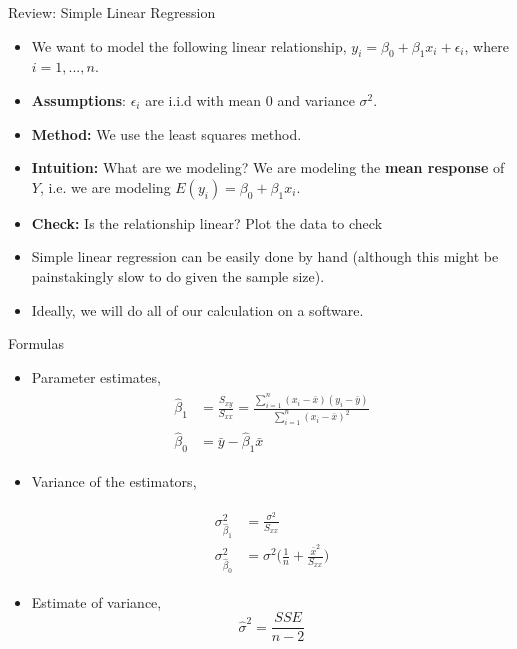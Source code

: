 \documentclass{beamer}
\begin{document}
	
	
	
	
	\begin{frame}{Review: Simple Linear Regression}
		\begin{itemize}
			\item We want to model the following linear relationship, $y_i=\beta_0+\beta_1x_i+\epsilon_i$, where $i=1,...,n$.
			\item \textbf{Assumptions}: $\epsilon_i$ are i.i.d with mean $0$ and variance $\sigma^2$.
			\item \textbf{Method:} We use the least squares method.
			\item \textbf{Intuition:} What are we modeling? We are modeling the \textbf{mean response} of $Y$, i.e. we are modeling $E(y_i)=\beta_0+\beta_1x_i$.
			\item \textbf{Check:} Is the relationship linear? Plot the data to check
			\item Simple linear regression can be easily done by hand (although this might be painstakingly slow to do given the sample size).
			\item Ideally, we will do all of our calculation on a software.
		\end{itemize}
	\end{frame}
	
	
	\begin{frame}{Formulas}
		\begin{itemize}
			\item Parameter estimates,
			\begin{align*}
				\begin{split}
					\hat{\beta}_1 &= \frac{S_{xy}}{S_{xx}}=\frac{\sum^n_{i=1} (x_i-\bar{x})(y_i-\bar{y})}{ \sum^n_{i=1}  (x_i-\bar{x})^2}\\
					\hat{\beta}_0 &= \bar{y}-\hat{\beta}_1\bar{x} 
				\end{split}
			\end{align*}
			
			\item Variance of the estimators,
			
			\begin{align*}
				\begin{split}
					\sigma^2_{\hat{\beta}_1} &= \frac{\sigma^2}{S_{xx}}\\
					\sigma^2_{\hat{\beta}_0} &= \sigma^2 \Big(\frac{1}{n}+\frac{\bar{x}^2}{S_{xx}}\Big)
				\end{split}
			\end{align*}
			\item Estimate of variance, $$\hat{\sigma}^2=\frac{SSE}{n-2}$$
			
		\end{itemize}
	\end{frame}
	
\end{document}
